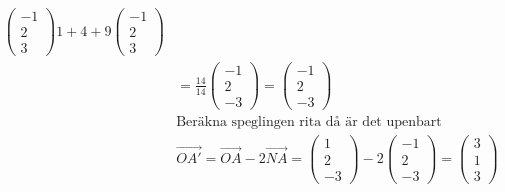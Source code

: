 \begin{multicols}{2}
\begin{align*}
{         \begin{pmatrix} -1 \\ 2 \\ 3 \end{pmatrix}}{1+4+9}
         \begin{pmatrix} -1 \\ 2 \\ 3 \end{pmatrix} \\
  &=\frac{14}{14}\begin{pmatrix} -1 \\ 2 \\ -3 \end{pmatrix} =
  \begin{pmatrix} -1 \\ 2 \\ -3 \end{pmatrix} \\
  &\text{Beräkna speglingen rita då är det upenbart } \\
  &\overrightarrow{OA'}= \overrightarrow{OA}-2\overrightarrow{NA}=
  \begin{pmatrix} 1 \\ 2 \\ -3 \end{pmatrix}-
  2\begin{pmatrix} -1 \\ 2 \\ -3 \end{pmatrix}=
  \begin{pmatrix} 3 \\ 1 \\ 3 \end{pmatrix} \\
\end{align*}



\end{multicols}
